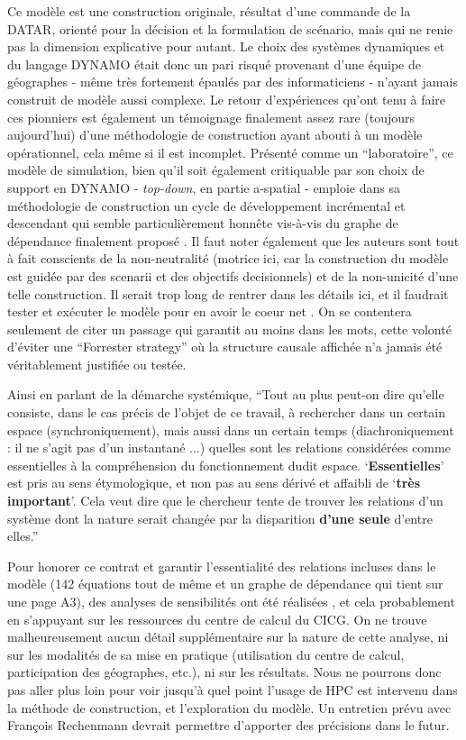 Ce modèle est une construction originale, résultat d'une commande de la DATAR, orienté pour la décision et la formulation de scénario, mais qui ne renie pas la dimension explicative pour autant. Le choix des systèmes dynamiques et du langage DYNAMO était donc un pari risqué provenant d'une équipe de géographes - même très fortement épaulés par des informaticiens - n'ayant jamais construit de modèle aussi complexe. Le retour d'expériences qu'ont tenu à faire ces pionniers est également un témoignage finalement assez rare (toujours aujourd'hui) d'une méthodologie de construction ayant abouti à un modèle opérationnel, cela même si il est incomplet. Présenté comme un \enquote{laboratoire}, ce modèle de simulation, bien qu'il soit également critiquable par son choix de support en DYNAMO - \textit{top-down}, en partie a-spatial - emploie dans sa méthodologie de construction un cycle de développement incrémental et descendant qui semble particulièrement honnête vis-à-vis du graphe de dépendance finalement proposé . Il faut noter également que les auteurs sont tout à fait conscients de la non-neutralité (motrice ici, car la construction du modèle est guidée par des scenarii et des objectifs decisionnels) et de la non-unicité d'une telle construction. Il serait trop long de rentrer dans les détails ici, et il faudrait tester et exécuter le modèle pour en avoir le coeur net . On se contentera seulement de citer un passage qui garantit au moins dans les mots, cette volonté d'éviter une \foreignquote{english}{Forrester strategy} \autocite[7-8]{Batty2001} où la structure causale affichée n'a jamais été véritablement justifiée ou testée.

Ainsi en parlant de la démarche systémique, \enquote{Tout au plus peut-on dire qu'elle consiste, dans le cas précis de l'objet de ce travail, à rechercher dans un certain espace (synchroniquement), mais aussi dans un certain temps (diachroniquement : il ne s'agit pas d'un instantané ...) quelles sont les relations considérées comme essentielles à la compréhension du fonctionnement dudit espace. \enquote{\textbf{Essentielles}} est pris au sens étymologique, et non pas au sens dérivé et affaibli de \enquote{\textbf{très important}}. Cela veut dire que le chercheur tente de trouver les relations d'un système dont la nature serait changée par la disparition \textbf{d'une seule} d'entre elles.} \autocite{AMORAL1983}

Pour honorer ce contrat et garantir l'essentialité des relations incluses dans le modèle (142 équations tout de même et un graphe de dépendance qui tient sur une page A3), des analyses de sensibilités ont été réalisées \autocite[34]{AMORAL1983}, et cela probablement en s'appuyant sur les ressources du centre de calcul du CICG. On ne trouve malheureusement aucun détail supplémentaire sur la nature de cette analyse, ni sur les modalités de sa mise en pratique (utilisation du centre de calcul, participation des géographes, etc.), ni sur les résultats. Nous ne pourrons donc pas aller plus loin pour voir jusqu'à quel point l'usage de HPC est intervenu dans la méthode de construction, et l'exploration du modèle. Un entretien prévu avec François Rechenmann devrait permettre d'apporter des précisions dans le futur.

